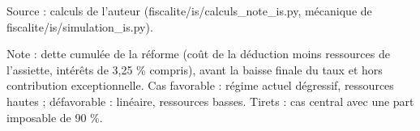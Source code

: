 Source : calculs de l'auteur (fiscalite/is/calculs\_note\_is.py, mécanique de fiscalite/is/simulation\_is.py).\par Note : dette cumulée de la réforme (coût de la déduction moins ressources de l'assiette, intérêts de 3,25 \% compris), avant la baisse finale du taux et hors contribution exceptionnelle. Cas favorable : régime actuel dégressif, ressources hautes ; défavorable : linéaire, ressources basses. Tirets : cas central avec une part imposable de 90 \%.
